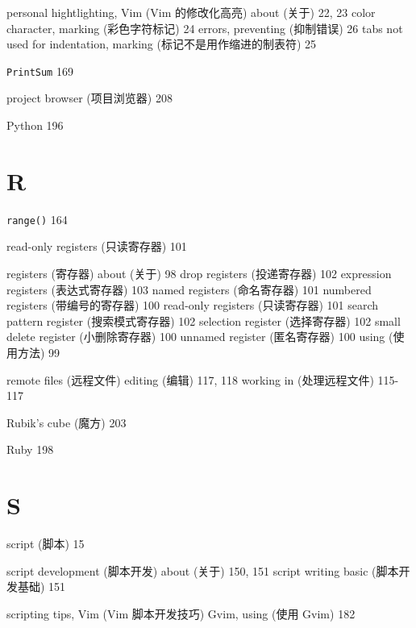 personal hightlighting, Vim (Vim 的修改化高亮)
  about (关于) 22, 23
  color character, marking (彩色字符标记) 24
  errors, preventing (抑制错误) 26
  tabs not used for indentation, marking (标记不是用作缩进的制表符) 25

\texttt{PrintSum} 169

project browser (项目浏览器) 208

Python 196

\section{R}

\texttt{range()} 164

read-only registers (只读寄存器) 101

registers (寄存器)
  about (关于) 98
  drop registers (投递寄存器) 102
  expression registers (表达式寄存器) 103
  named registers (命名寄存器) 101
  numbered registers (带编号的寄存器) 100
  read-only registers (只读寄存器) 101
  search pattern register (搜索模式寄存器) 102
  selection register (选择寄存器) 102
  small delete register (小删除寄存器) 100
  unnamed register (匿名寄存器) 100
  using (使用方法) 99

remote files (远程文件)
  editing (编辑) 117, 118
  working in (处理远程文件) 115-117

Rubik's cube (魔方) 203

Ruby 198

\section{S}

script (脚本) 15

script development (脚本开发)
  about (关于) 150, 151
  script writing basic (脚本开发基础) 151

scripting tips, Vim (Vim 脚本开发技巧)
  Gvim, using (使用 Gvim) 182

